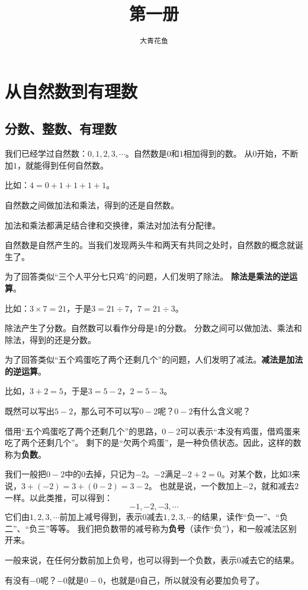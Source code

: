 \documentclass[12pt,UTF8]{ctexbook}
\title{\zihao{0} \bfseries 第一册}
\author{\zihao{2} \texttt{大青花鱼}}
\date{}
\theoremstyle{definition}
\theoremstyle{plain}
\begin{document}
\maketitle
\tableofcontents
\newpage

\chapter{从自然数到有理数}

\section{分数、整数、有理数}
我们已经学过自然数：$0,1,2,3,\cdots$。自然数是$0$和$1$相加得到的数。
从$0$开始，不断加$1$，就能得到任何自然数。

比如：$4 = 0 + 1 + 1 + 1 + 1$。

自然数之间做加法和乘法，得到的还是自然数。

加法和乘法都满足结合律和交换律，乘法对加法有分配律。

自然数是自然产生的。当我们发现两头牛和两天有共同之处时，自然数的概念就诞生了。

为了回答类似“三个人平分七只鸡”的问题，人们发明了除法。
\textbf{除法是乘法的逆运算}。

比如：$3 \times 7 = 21$，于是$3 = 21 \div 7$，$7 = 21 \div 3$。

除法产生了分数。自然数可以看作分母是$1$的分数。
分数之间可以做加法、乘法和除法，得到的还是分数。

为了回答类似“五个鸡蛋吃了两个还剩几个”的问题，人们发明了减法。\textbf{减法是加法的逆运算}。

比如，$3+2=5$，于是$3 = 5 - 2$，$2 = 5 - 3$。

既然可以写出$5-2$，那么可不可以写$0-2$呢？$0-2$有什么含义呢？

借用“五个鸡蛋吃了两个还剩几个”的思路，$0-2$可以表示“本没有鸡蛋，借鸡蛋来吃了两个还剩几个”。
剩下的是“欠两个鸡蛋”，是一种负债状态。因此，这样的数称为\textbf{负数}。

我们一般把$0-2$中的$0$去掉，只记为$-2$。$-2$满足$-2+2=0$。对某个数，比如$3$来说，$3+(-2)=3+(0-2)=3-2$。
也就是说，一个数加上$-2$，就和减去$2$一样。以此类推，可以得到：
$$ -1, -2, -3, \cdots $$
它们由$1,2,3,\cdots$前加上减号得到，表示$0$减去$1,2,3,\cdots$的结果，读作“负一”、“负二”、“负三”等等。
我们把负数带的减号称为\textbf{负号}（读作“负”），和一般减法区别开来。

一般来说，在任何分数前加上负号，也可以得到一个负数，表示$0$减去它的结果。

有没有$-0$呢？$-0$就是$0-0$，也就是$0$自己，所以就没有必要加负号了。
\end{document}
